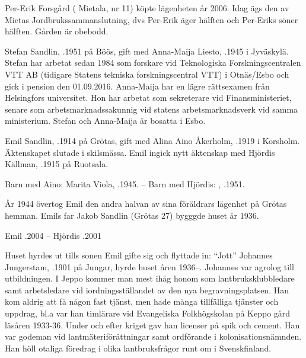 
Per-Erik Forsgård ( Mietala, nr 11) köpte lägenheten år 2006. Idag ägs den av Mietas Jordbrukssammanslutning, dvs Per-Erik äger hälften och Per-Eriks söner hälften. Gården är obebodd.

Stefan Sandlin, .1951 på Böös, gift med Anna-Maija Liesto, .1945 i Jyväskylä. Stefan har arbetat sedan 1984 som forskare vid Teknologiska Forskningscentralen VTT AB (tidigare Statens tekniska forskningscentral VTT) i Otnäs/Esbo och gick i pension den 01.09.2016. Anna-Maija har en lägre rättsexamen från Helsingfors universitet. Hon har arbetat som sekreterare vid Finansministeriet, senare som arbetsmarknadssakunnig vid statens arbetsmarknadsverk vid samma ministerium. Stefan och Anna-Maija är bosatta i Esbo.

Emil Sandlin, .1914 på Grötas, gift med Alina Aino Åkerholm, .1919 i Korsholm. Äktenskapet slutade i skilsmässa. Emil ingick nytt äktenskap med Hjördis Källman, .1915 på Ruotsala.


Barn med Aino: Marita Viola, .1945. -- Barn med Hjördis: , .1951.

År 1944 övertog Emil den andra halvan av sina föräldrars lägenhet på Grötas hemman. Emils far Jakob Sandlin (Grötas 27) bygggde huset 			 år 1936.

Emil .2004  --  Hjördis .2001


Huset hyrdes ut tills sonen Emil gifte sig och flyttade in: ``Jott'' Johannes Jungerstam, .1901 på Jungar, hyrde huset åren 1936--. Johannes var agrolog till utbildningen. I Jeppo kommer man mest ihåg honom som lantbruksklubbledare samt arbetsledare vid iordningsställandet av den nya begravningsplatsen. Han kom aldrig att få någon fast tjänst, men hade många tillfälliga tjänster och uppdrag, bl.a var han timlärare vid Evangeliska Folkhögskolan på Keppo gård läsåren 1933-36. Under och efter kriget gav han licenser på spik och cement. Han var godeman vid lantmäteriförättningar samt ordförande i kolonisationsnämnden. Han höll otaliga föredrag i olika lantbruksfrågor runt om i Svenskfinland.

